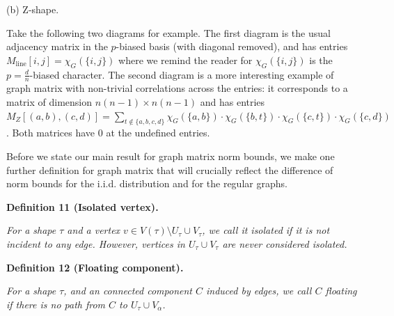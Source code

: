 \documentclass[10pt,a4paper]{article}
\begin{document}
(b) Z-shape.






Take the following two diagrams for example.
The first diagram is the usual adjacency matrix in the $p$-biased basis (with diagonal removed), and has entries $M_{\text{line}}[i,j]=\chi_{G}(\{i,j\})$ where we remind the reader for $\chi_{G}(\{i,j\})$ is the $p=\frac{d}{n}$-biased character. The second diagram is a more interesting example of graph matrix with non-trivial correlations across the entries: it corresponds to a matrix of dimension $n(n-1)\times n(n-1)$ and has entries $M_{Z}[(a,b),(c,d)]=\sum_{t\notin\{a,b,c,d\}}\chi_{G}(\{a,b\})\cdot\chi_{G}(\{b,t\})\cdot\chi_{G}(\{c,t\})\cdot\chi_{G}(\{c,d\})$. Both matrices have $0$ at the undefined entries.\par




Before we state our main result for graph matrix norm bounds, we make one further definition for graph matrix that will crucially reflect the difference of norm bounds for the i.i.d. distribution and for the regular graphs.\par





\par\medskip\noindent\textbf{
\textbf{Definition 11}\textbf{ }(Isolated vertex)\textbf{.}
}\par



\emph{For a shape $\tau$ and a vertex $v\in V(\tau)\setminus U_{\tau}\cup V_{\tau}$, we call it isolated if it is not incident to any edge. However, vertices in $U_{\tau}\cup V_{\tau}$ are never considered isolated.}\par







\par\medskip\noindent\textbf{
\textbf{Definition 12}\textbf{ }(Floating component)\textbf{.}
}\par



\emph{For a shape $\tau$, and an connected component $C$ induced by edges, we call $C$ floating if there is no path from $C$ to $U_{\tau}\cup V_{\alpha}$.}\par
\end{document}
